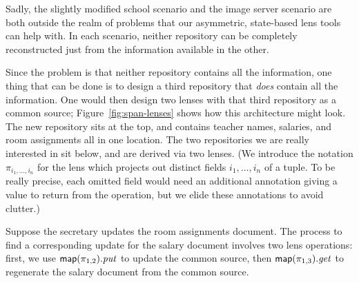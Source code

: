 Sadly, the slightly modified school scenario and the image server scenario
are both outside the realm of problems that our asymmetric, state-based lens
tools can help with. In each scenario, neither repository can be completely
reconstructed just from the information available in the other.

Since the problem is that neither repository contains all the information,
one thing that can be done is to design a third repository that \emph{does}
contain all the information. One would then design two lenses with that
third repository as a common source; Figure~\ref{fig:span-lenses} shows how
this architecture might look. The new repository sits at the top, and
contains teacher names, salaries, and room assignments all in one location.
The two repositories we are really interested in sit below, and are derived
via two lenses. (We introduce the notation $\pi_{i_1,\ldots,i_n}$ for the
lens which projects out distinct fields $i_1,\ldots,i_n$ of a tuple. To be
really precise, each omitted field would need an additional annotation
giving a value to return from the \CREATE operation, but we elide these
annotations to avoid clutter.)

Suppose the secretary updates the room assignments document. The process to
find a corresponding update for the salary document involves two lens
operations: first, we use $\mathsf{map}(\pi_{1,2}).\mathit{put}$ to update the common
source, then $\mathsf{map}(\pi_{1,3}).\mathit{get}$ to regenerate the salary document from
the common source.

